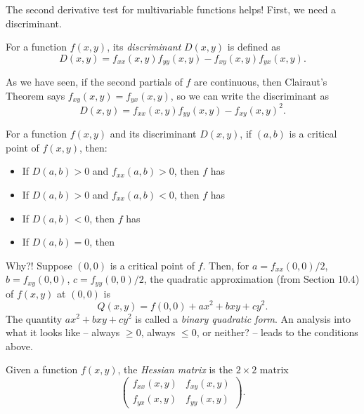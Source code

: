 The second derivative test for multivariable functions helps! First, we need a discriminant.
\begin{defn}
    For a function $f(x,y)$, its \emph{discriminant} $D(x,y)$ is defined as \[D(x,y)=f_{xx}(x,y) f_{yy}(x,y) - f_{xy}(x,y)f_{yx}(x,y).\]
\end{defn}

As we have seen, if the second partials of $f$ are continuous, then Clairaut's Theorem says $f_{xy}(x,y)=f_{yx}(x,y)$, so we can write the discriminant as 
\[
    D(x,y)=f_{xx}(x,y)f_{yy}(x,y)-f_{xy}(x,y)^2.
\]
\medskip 

\begin{prop}
    For a function $f(x,y)$ and its discriminant $D(x,y)$, if $(a,b)$ is a critical point of $f(x,y)$, then:
    \begin{itemize}
        \item If $D(a,b)>0$ and $f_{xx}(a,b)>0$, then $f$ has \\ %
        \item If $D(a,b)>0$ and $f_{xx}(a,b)<0$, then $f$ has \\ %
        \item If $D(a,b)<0$, then $f$ has \\ %
        \item If $D(a,b)=0$, then \\ %
    \end{itemize}
\end{prop}

\vfill 

Why?! Suppose $(0,0)$ is a critical point of $f$. Then, for $a=f_{xx}(0,0)/2$, $b=f_{xy}(0,0)$, $c=f_{yy}(0,0)/2$, the quadratic approximation (from Section 10.4) of $f(x,y)$ at $(0,0)$ is \[Q(x,y)=f(0,0)+ax^2+bxy+cy^2.\] The quantity $ax^2+bxy+cy^2$ is called a \emph{binary quadratic form}. An analysis into what it looks like -- always $\ge0$, always $\le0$, or neither? -- leads to the conditions above.

\pagebreak 

\begin{defn}
    Given a function $f(x,y)$, the \emph{Hessian matrix} is the $2\times2$ matrix \[\begin{pmatrix}f_{xx}(x,y) & f_{xy}(x,y) \\ f_{yx}(x,y)&f_{yy}(x,y)\end{pmatrix}.\]
\end{defn}

